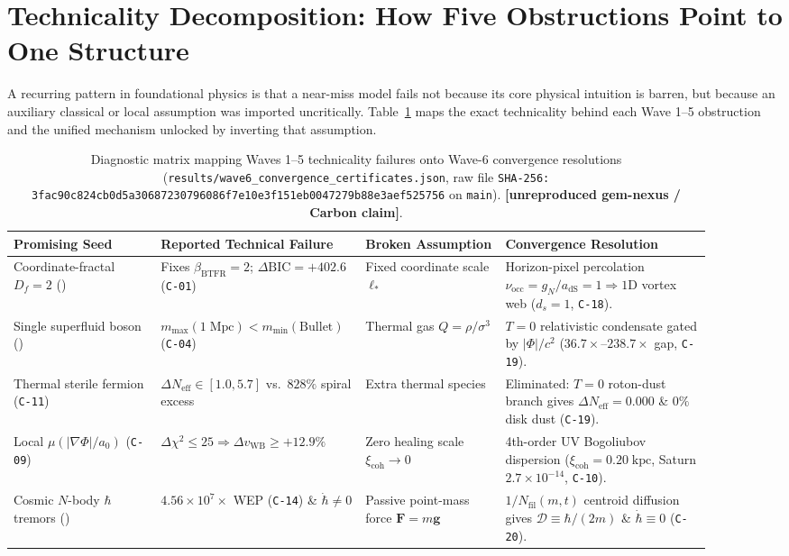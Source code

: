 \documentclass[11pt,letterpaper]{article}
\newcommand{\unrepro}{\textbf{\textcolor{red!60!black}{[unreproduced gem-nexus / Carbon claim]}}}
\begin{document}
\section{Technicality Decomposition: How Five Obstructions Point to One Structure}

A recurring pattern in foundational physics is that a near-miss model fails not because its core physical intuition is barren, but because an auxiliary classical or local assumption was imported uncritically. Table~\ref{tab:decomp} maps the exact technicality behind each Wave 1--5 obstruction and the unified mechanism unlocked by inverting that assumption.

\begin{table}[!htbp]
\centering
\caption{Diagnostic matrix mapping Waves 1--5 technicality failures onto Wave-6 convergence resolutions (\texttt{results/wave6\_convergence\_certificates.json}, raw file \texttt{SHA-256: 3fac90c824cb0d5a30687230796086f7e10e3f151eb0047279b88e3aef525756} on \texttt{main}). \unrepro.}
\label{tab:decomp}
\footnotesize
\begin{tabular}{@{}p{0.20\linewidth}p{0.23\linewidth}p{0.19\linewidth}p{0.28\linewidth}@{}}
\toprule
\textbf{Promising Seed} & \textbf{Reported Technical Failure} & \textbf{Broken Assumption} & \textbf{Convergence Resolution} \\
\midrule
Coordinate-fractal $D_f=2$ (\cite{Calcagni2010}) & Fixes $\beta_{\mathrm{BTFR}} = 2$; $\Delta\mathrm{BIC} = +402.6$ (\texttt{C-01}) & Fixed coordinate scale $\ell_*$ & Horizon-pixel percolation $\nu_{\mathrm{occ}} = g_N/a_{\mathrm{dS}} = 1 \Rightarrow 1\mathrm{D}$ vortex web ($d_s=1$, \texttt{C-18}). \\
Single superfluid boson (\cite{BerezhianiKhoury2015}) & $m_{\max}(1\;\mathrm{Mpc}) < m_{\min}(\mathrm{Bullet})$ (\texttt{C-04}) & Thermal gas $Q = \rho/\sigma^3$ & $T=0$ relativistic condensate gated by $|\Phi|/c^2$ ($36.7\times$--$238.7\times$ gap, \texttt{C-19}). \\
Thermal sterile fermion (\texttt{C-11}) & $\Delta N_{\mathrm{eff}} \in [1.0, 5.7]$ vs.\ $828\%$ spiral excess \cite{Planck2020} & Extra thermal species & Eliminated: $T=0$ roton-dust branch gives $\Delta N_{\mathrm{eff}} = 0.000$ \& $0\%$ disk dust (\texttt{C-19}). \\
Local $\mu(|\nabla\Phi|/a_0)$ (\texttt{C-09}) & $\Delta\chi^2 \le 25 \Rightarrow \Delta v_{\mathrm{WB}} \ge +12.9\%$ \cite{Banik2024} & Zero healing scale $\xi_{\mathrm{coh}}\to 0$ & 4th-order UV Bogoliubov dispersion ($\xi_{\mathrm{coh}} = 0.20\;\mathrm{kpc}$, Saturn $2.7\times 10^{-14}$, \texttt{C-10}). \\
Cosmic $N$-body $\hbar$ tremors (\cite{Calogero2004}) & $4.56\times 10^7\times$ WEP (\texttt{C-14}) \& $\dot{\hbar}\neq 0$ \cite{Gaeta2000} & Passive point-mass force $\mathbf{F}=m\mathbf{g}$ & $1/N_{\mathrm{fil}}(m,t)$ centroid diffusion gives $\mathcal{D}\equiv\hbar/(2m)$ \& $\dot{\hbar}\equiv 0$ (\texttt{C-20}). \\
\bottomrule
\end{tabular}
\end{table}
\end{document}
